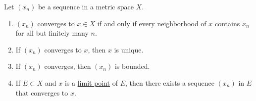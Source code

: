   \begin{theorem}
    \label{thm:sufficient-conditions-for-convergence-in-metric}
    Let $(x_n)$ be a sequence in a metric space $X$. 
    \begin{enumerate}
      \item $(x_n)$ converges to $x \in X$ if and only if every neighborhood of $x$ contains $x_n$ for all but finitely many $n$. 
      \item If $(x_n)$ converges to $x$, then $x$ is unique. 
      \item If $(x_n)$ converges, then $(x_n)$ is bounded. 
      \item If $E \subset X$ and $x$ is a \hyperref[def:limit-point]{limit point} of $E$, then there exists a sequence $(x_n)$ in $E$ that converges to $x$. 
    \end{enumerate}
  \end{theorem}
